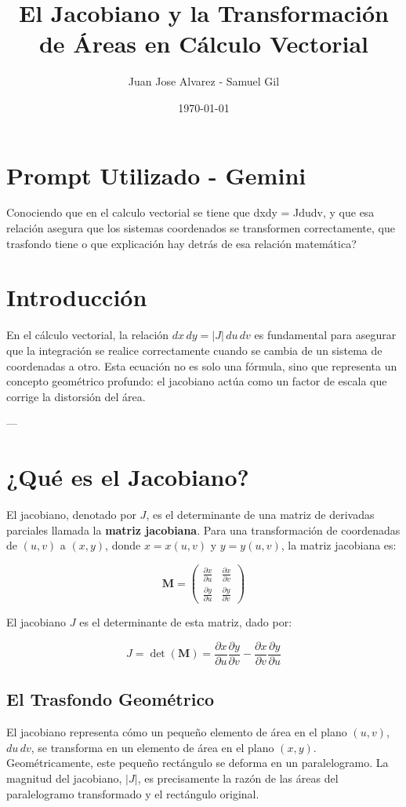 \documentclass{article}
\title{El Jacobiano y la Transformación de Áreas en Cálculo Vectorial}
\author{Juan Jose Alvarez - Samuel Gil}
\date{\today}
\begin{document}
\maketitle

\section*{Prompt Utilizado - Gemini}
Conociendo que en el calculo vectorial se tiene que dxdy = Jdudv, y que esa relación asegura que los sistemas coordenados se transformen correctamente, que trasfondo tiene o que explicación hay detrás de esa relación matemática?

\section*{Introducción}
En el cálculo vectorial, la relación $dx\,dy = |J|\,du\,dv$ es fundamental para asegurar que la integración se realice correctamente cuando se cambia de un sistema de coordenadas a otro. Esta ecuación no es solo una fórmula, sino que representa un concepto geométrico profundo: el jacobiano actúa como un factor de escala que corrige la distorsión del área.

---

\section*{¿Qué es el Jacobiano?}
El jacobiano, denotado por $J$, es el determinante de una matriz de derivadas parciales llamada la \textbf{matriz jacobiana}. Para una transformación de coordenadas de $(u, v)$ a $(x, y)$, donde $x = x(u, v)$ y $y = y(u, v)$, la matriz jacobiana es:

\[
\mathbf{M} = 
\begin{pmatrix}
\frac{\partial x}{\partial u} & \frac{\partial x}{\partial v} \\
\frac{\partial y}{\partial u} & \frac{\partial y}{\partial v}
\end{pmatrix}
\]

El jacobiano $J$ es el determinante de esta matriz, dado por:

\[
J = \det(\mathbf{M}) = \frac{\partial x}{\partial u} \frac{\partial y}{\partial v} - \frac{\partial x}{\partial v} \frac{\partial y}{\partial u}
\]

\subsection*{El Trasfondo Geométrico}
El jacobiano representa cómo un pequeño elemento de área en el plano $(u, v)$, $du\,dv$, se transforma en un elemento de área en el plano $(x, y)$. Geométricamente, este pequeño rectángulo se deforma en un paralelogramo. La magnitud del jacobiano, $|J|$, es precisamente la razón de las áreas del paralelogramo transformado y el rectángulo original.
\end{document}
